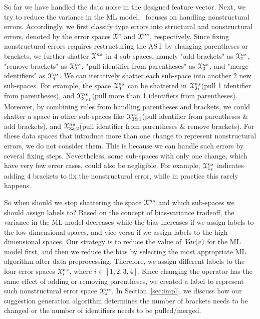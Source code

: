 \documentclass[12pt]{report}	%
\begin{document}
So far we have handled the data noise in the 
designed feature vector.
Next, we try to reduce the variance in the ML model.
\newCompiler\ focuses on handling nonstructural errors.
Accordingly, we first classify type errors into structural and nonstructural errors,
denoted by the error spaces $\mathcal{X}^{s}$ and $\mathcal{X}^{ns}$, respectively.
Since fixing nonstructural errors requires restructuring the AST by changing
parentheses or brackets, we further shatter $\mathcal{X}^{ns}$ in 4 sub-spaces,
namely "add brackets" as $\mathcal{X}^{ns}_{1}$, "remove brackets" as $\mathcal{X}^{ns}_{2}$,
"pull identifier from parentheses" as $\mathcal{X}^{ns}_{3}$,
and "merge identifiers" as $\mathcal{X}^{ns}_{4}$.
We can iteratively shatter each sub-space into another 2 new
sub-spaces. For example, the space $\mathcal{X}^{ns}_{3}$ can be
shattered in $\mathcal{X}^{ns}_{3_{1}}$(pull 1 identifier from parentheses), and
$\mathcal{X}^{ns}_{3_{>1}}$(pull more than 1 identifiers from parentheses).
Moreover, by combining rules from handling parentheses and brackets,
we could shatter a space in other sub-spaces 
like $\mathcal{X}^{ns}_{3\&1}$(pull identifier from parentheses \& add brackets),
and $\mathcal{X}^{ns}_{3\&2}$(pull identifier from parentheses \& remove brackets).
For these data spaces that introduce more than one change
to represent nonstructural errors,
we do not consider them.
This is because we can handle such errors by
several fixing steps.
%
Nevertheless,
some sub-spaces with only one change,
which have very few error cases,
could also be negligible.
For example, $\mathcal{X}^{ns}_{1_{4}}$ indicates adding 4 brackets to fix the nonstructural error,
while in practice this rarely happens.

So when should we stop shattering the space $\mathcal{X}^{ns}$ and which sub-spaces we should
assign labels to? Based on the concept of bias-variance tradeoff,
the variance in the ML model decreases while the bias increases
if we assign labels to the low dimensional spaces,
and vice versa if we assign labels to the high dimensional spaces. 
Our strategy is to reduce the value of $\textit{Var}(v)$ for the ML model first,
and then we reduce the bias by selecting 
the most appropriate ML algorithm after data preprocessing.
Therefore, we assign different labels to
the four error spaces $\mathcal{X}^{ns}_{i}$,
where $i \in [1,2,3,4]$.
Since changing the operator \prog{\$}
has the same effect of adding or removing 
parentheses, 
we created a label to represent such nonstructural error space $\mathcal{X}^{ns}_{s}$.
In Section~\ref{sec:impl},
we discuss how our suggestion
generation algorithm determines the number of brackets needs to be changed
or the number of identifiers needs to be pulled/merged.
\end{document}
